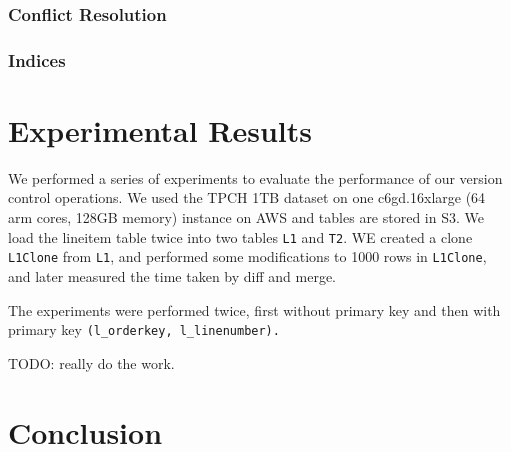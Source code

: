 \documentclass[sigconf,nonacm]{acmart} %
\begin{document}
\subsubsection{Conflict Resolution}

\subsubsection{Indices}

\section{Experimental Results}
We performed a series of experiments to evaluate the performance of 
our version control operations.  We used the TPCH 1TB dataset on one 
c6gd.16xlarge (64 arm cores, 128GB memory) instance on AWS and tables 
are stored in S3.  We load the lineitem table twice into two tables 
\texttt{L1} and \texttt{T2}.  WE created a clone \texttt{L1Clone} 
from \texttt{L1}, and performed some modifications to 1000 rows in 
\texttt{L1Clone}, and later measured the time taken by diff and merge.

The experiments were performed twice, first without primary key and
then with primary key \texttt{(l\_orderkey, l\_linenumber).}

TODO: really do the work.

\section{Conclusion}
\end{document}
